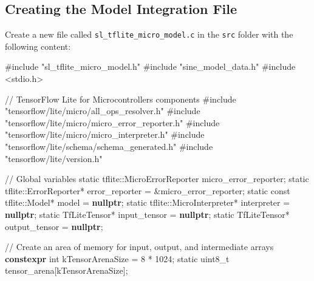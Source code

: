 \documentclass[
  9pt,
  letterpaper,
  abstract,
  titlepage]{scrbook}
\newenvironment{Shaded}{\begin{snugshade}}{\end{snugshade}}
\newcommand{\CommentTok}[1]{\textcolor[rgb]{0.37,0.37,0.37}{#1}}
\newcommand{\DataTypeTok}[1]{\textcolor[rgb]{0.68,0.00,0.00}{#1}}
\newcommand{\DecValTok}[1]{\textcolor[rgb]{0.68,0.00,0.00}{#1}}
\newcommand{\ImportTok}[1]{\textcolor[rgb]{0.00,0.46,0.62}{#1}}
\newcommand{\KeywordTok}[1]{\textcolor[rgb]{0.00,0.23,0.31}{\textbf{#1}}}
\newcommand{\NormalTok}[1]{\textcolor[rgb]{0.00,0.23,0.31}{#1}}
\newcommand{\OperatorTok}[1]{\textcolor[rgb]{0.37,0.37,0.37}{#1}}
\newcommand{\PreprocessorTok}[1]{\textcolor[rgb]{0.68,0.00,0.00}{#1}}
\begin{document}
\subsection{Creating the Model Integration
File}\label{creating-the-model-integration-file}

Create a new file called \texttt{sl\_tflite\_micro\_model.c} in the
\texttt{src} folder with the following content:

\begin{Shaded}
\begin{Highlighting}[]
\PreprocessorTok{\#include }\ImportTok{"sl\_tflite\_micro\_model.h"}
\PreprocessorTok{\#include }\ImportTok{"sine\_model\_data.h"}
\PreprocessorTok{\#include }\ImportTok{\textless{}stdio.h\textgreater{}}

\CommentTok{// TensorFlow Lite for Microcontrollers components}
\PreprocessorTok{\#include }\ImportTok{"tensorflow/lite/micro/all\_ops\_resolver.h"}
\PreprocessorTok{\#include }\ImportTok{"tensorflow/lite/micro/micro\_error\_reporter.h"}
\PreprocessorTok{\#include }\ImportTok{"tensorflow/lite/micro/micro\_interpreter.h"}
\PreprocessorTok{\#include }\ImportTok{"tensorflow/lite/schema/schema\_generated.h"}
\PreprocessorTok{\#include }\ImportTok{"tensorflow/lite/version.h"}

\CommentTok{// Global variables}
\DataTypeTok{static}\NormalTok{ tflite}\OperatorTok{::}\NormalTok{MicroErrorReporter micro\_error\_reporter}\OperatorTok{;}
\DataTypeTok{static}\NormalTok{ tflite}\OperatorTok{::}\NormalTok{ErrorReporter}\OperatorTok{*}\NormalTok{ error\_reporter }\OperatorTok{=} \OperatorTok{\&}\NormalTok{micro\_error\_reporter}\OperatorTok{;}
\DataTypeTok{static} \DataTypeTok{const}\NormalTok{ tflite}\OperatorTok{::}\NormalTok{Model}\OperatorTok{*}\NormalTok{ model }\OperatorTok{=} \KeywordTok{nullptr}\OperatorTok{;}
\DataTypeTok{static}\NormalTok{ tflite}\OperatorTok{::}\NormalTok{MicroInterpreter}\OperatorTok{*}\NormalTok{ interpreter }\OperatorTok{=} \KeywordTok{nullptr}\OperatorTok{;}
\DataTypeTok{static}\NormalTok{ TfLiteTensor}\OperatorTok{*}\NormalTok{ input\_tensor }\OperatorTok{=} \KeywordTok{nullptr}\OperatorTok{;}
\DataTypeTok{static}\NormalTok{ TfLiteTensor}\OperatorTok{*}\NormalTok{ output\_tensor }\OperatorTok{=} \KeywordTok{nullptr}\OperatorTok{;}

\CommentTok{// Create an area of memory for input, output, and intermediate arrays}
\KeywordTok{constexpr} \DataTypeTok{int}\NormalTok{ kTensorArenaSize }\OperatorTok{=} \DecValTok{8} \OperatorTok{*} \DecValTok{1024}\OperatorTok{;}
\DataTypeTok{static} \DataTypeTok{uint8\_t}\NormalTok{ tensor\_arena}\OperatorTok{[}\NormalTok{kTensorArenaSize}\OperatorTok{];}


\end{Highlighting}
\end{Shaded}
\end{document}
